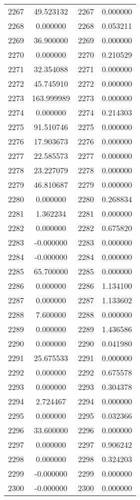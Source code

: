 \documentclass[12pt]{article}
\begin{document}
\begin{longtable}{@{}cccc@{}}
2267 & 49.523132 & 2267 & 0.000000 \\
2268 & 0.000000 & 2268 & 0.053211 \\
2269 & 36.900000 & 2269 & 0.000000 \\
2270 & 0.000000 & 2270 & 0.210529 \\
2271 & 32.354088 & 2271 & 0.000000 \\
2272 & 45.745910 & 2272 & 0.000000 \\
2273 & 163.999989 & 2273 & 0.000000 \\
2274 & 0.000000 & 2274 & 0.214303 \\
2275 & 91.510746 & 2275 & 0.000000 \\
2276 & 17.903673 & 2276 & 0.000000 \\
2277 & 22.585573 & 2277 & 0.000000 \\
2278 & 23.227079 & 2278 & 0.000000 \\
2279 & 46.810687 & 2279 & 0.000000 \\
2280 & 0.000000 & 2280 & 0.268834 \\
2281 & 1.362234 & 2281 & 0.000000 \\
2282 & 0.000000 & 2282 & 0.675820 \\
2283 & -0.000000 & 2283 & 0.000000 \\
2284 & -0.000000 & 2284 & 0.000000 \\
2285 & 65.700000 & 2285 & 0.000000 \\
2286 & 0.000000 & 2286 & 1.134100 \\
2287 & 0.000000 & 2287 & 1.133602 \\
2288 & 7.600000 & 2288 & 0.000000 \\
2289 & 0.000000 & 2289 & 1.436586 \\
2290 & 0.000000 & 2290 & 0.041980 \\
2291 & 25.675533 & 2291 & 0.000000 \\
2292 & 0.000000 & 2292 & 0.675578 \\
2293 & 0.000000 & 2293 & 0.304378 \\
2294 & 2.724467 & 2294 & 0.000000 \\
2295 & 0.000000 & 2295 & 0.032366 \\
2296 & 33.600000 & 2296 & 0.000000 \\
2297 & 0.000000 & 2297 & 0.906242 \\
2298 & 0.000000 & 2298 & 0.324203 \\
2299 & -0.000000 & 2299 & 0.000000 \\
2300 & -0.000000 & 2300 & 0.000000 \\

\end{longtable}
\end{document}
